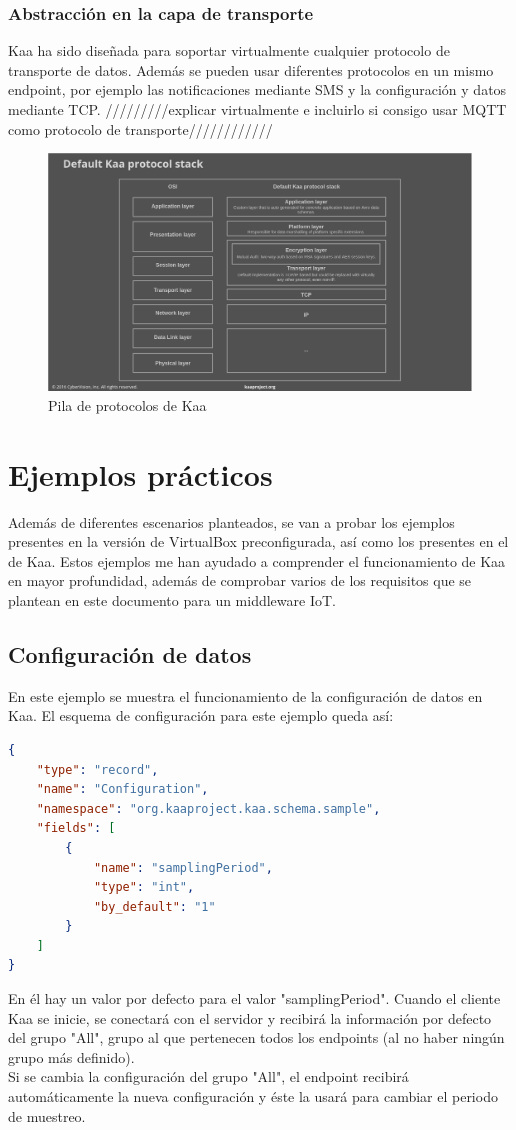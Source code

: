 \documentclass[12pt, twoside]{book}
\newcommand{\MYhref}[3][blue]{\href{#2}{\color{#1}{#3}}}
\begin{document}
\subsubsection*{Abstracción en la capa de transporte}
Kaa ha sido diseñada para soportar virtualmente cualquier protocolo de transporte de datos. Además se pueden usar diferentes protocolos en un mismo endpoint, por ejemplo las notificaciones mediante SMS y la configuración y datos mediante TCP. /////////explicar virtualmente e incluirlo si consigo usar MQTT como protocolo de transporte////////////
\begin{figure}[H]
\centering
\includegraphics[scale=0.4]{images/kaa_stack}
\caption{Pila de protocolos de Kaa}\label{L508}
\end{figure}


\section{Ejemplos prácticos}
Además de diferentes escenarios planteados, se van a probar los ejemplos  presentes en la versión de VirtualBox preconfigurada, así como los presentes en el \MYhref{https://github.com/kaaproject/sample-apps}{GIT} de Kaa. Estos ejemplos me han ayudado a comprender el funcionamiento de Kaa en mayor profundidad, además de comprobar varios de los requisitos que se plantean en este documento para un middleware IoT. 

\subsection{Configuración de datos}
En este ejemplo se muestra el funcionamiento de la configuración de datos en Kaa. El esquema de configuración para este ejemplo queda así:
\begin{lstlisting}[language=json]
{
	"type": "record",
	"name": "Configuration",
	"namespace": "org.kaaproject.kaa.schema.sample",
	"fields": [
		{
			"name": "samplingPeriod",
			"type": "int",
			"by_default": "1"
		}
	]
}
\end{lstlisting}
En él hay un valor por defecto para el valor "samplingPeriod". Cuando el cliente Kaa se inicie, se conectará con el servidor y recibirá la información por defecto del grupo "All", grupo al que pertenecen todos los endpoints (al no haber ningún grupo más definido).\\
Si se cambia la configuración del grupo "All", el endpoint recibirá automáticamente la nueva configuración y éste la usará para cambiar el periodo de muestreo.
\end{document}

